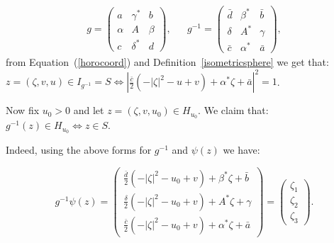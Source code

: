 \documentclass{article}[12pt]
\begin{document}
\begin{eqnarray}\label{standardform}
g=\left(\begin{array}{ccc} a & \gamma^* & b \\
\alpha & A & \beta \\
c & \delta^* & d 
\end{array}\right),
&
&
g^{-1}=\left(\begin{array}{ccc} \bar{d} & \beta^* & \bar{b} \\
\delta & A^* & \gamma \\
\bar{c} & \alpha^* & \bar{a} 
\end{array}\right),
\end{eqnarray}
from Equation~(\ref{horocoord}) and Definition~\ref{isometricsphere} we get that: $z=(\zeta,v,u) \in I_{g^{-1}}=S \iff \left| \frac{\bar{c}}{2}(-|\zeta|^2-u+v)+\alpha^*\zeta+\bar{a} \right|^2=1$.

Now fix $u_0>0$ and let $z=(\zeta,v,u_0) \in H_{u_0}$. We claim that: $g^{-1}(z) \in H_{u_0} \iff z \in S$. 

Indeed, using the above forms for $g^{-1}$ and $\psi(z)$ we have:

$$g^{-1}\psi(z)=\left( \begin{array}{c} \frac{\bar{d}}{2}(-|\zeta|^2-u_0+v)+\beta^*\zeta+\bar{b} \\
\frac{\delta}{2}(-|\zeta|^2-u_0+v)+A^*\zeta+\gamma \\
\frac{\bar{c}}{2}(-|\zeta|^2-u_0+v)+\alpha^*\zeta+\bar{a} 
\end{array}\right)=\left( \begin{array}{c} \zeta_1 \\ \zeta_2 \\ \zeta_3 \end{array}\right).
$$
\end{document}
